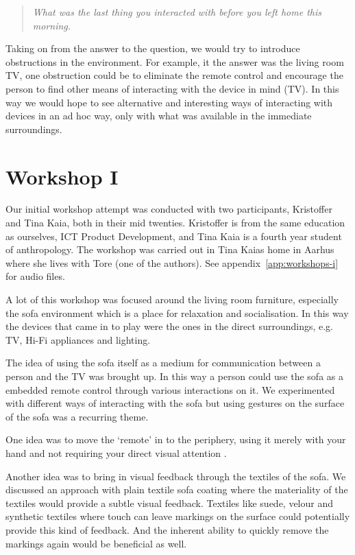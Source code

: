 \begin{quotation}
  \emph{What was the last thing you interacted with before you left home this morning.}
\end{quotation}

Taking on from the answer to the question, we would try to introduce obstructions in the environment.
For example, it the answer was the living room TV, one obstruction could be to eliminate the remote control and encourage the person to find other means of interacting with the device in mind (TV).
In this way we would hope to see alternative and interesting ways of interacting with devices in an ad hoc way, only with what was available in the immediate surroundings.

\section{Workshop I}
\label{ch:workshops:workshop-i}
Our initial workshop attempt was conducted with two participants, Kristoffer and Tina Kaia, both in their mid twenties.
Kristoffer is from the same education as ourselves, ICT Product Development, and Tina Kaia is a fourth year student of anthropology.
The workshop was carried out in Tina Kaias home in Aarhus where she lives with Tore (one of the authors).
See appendix~\ref{app:workshops-i} for  audio files.

A lot of this workshop was focused around the living room furniture, especially the sofa environment which is a place for relaxation and socialisation.
In this way the devices that came in to play were the ones in the direct surroundings, e.g. TV, Hi-Fi appliances and lighting. 

The idea of using the sofa itself as a medium for communication between a person and the TV was brought up.
In this way a person could use the sofa as a embedded remote control through various interactions on it.
We experimented with different ways of interacting with the sofa but using gestures on the surface of the sofa was a recurring theme.

One idea was to move the `remote' in to the periphery, using it merely with your hand and not requiring your direct visual attention .

Another idea was to bring in visual feedback through the textiles of the sofa.
We discussed an approach with plain textile sofa coating where the materiality of the textiles would provide a subtle visual feedback.
Textiles like suede, velour and synthetic textiles where touch can leave markings on the surface could potentially provide this kind of feedback.
And the inherent ability to quickly remove the markings again would be beneficial as well.

